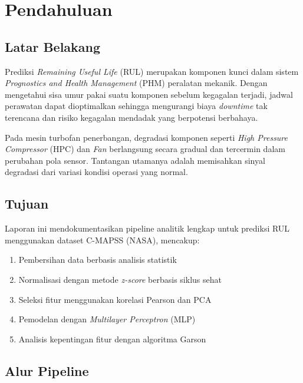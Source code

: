 \documentclass[11pt,a4paper]{article}
\begin{document}
\thispagestyle{empty}
\newpage
\setcounter{page}{1}

\tableofcontents
\newpage

\section{Pendahuluan}

\subsection{Latar Belakang}

Prediksi \textit{Remaining Useful Life} (RUL) merupakan komponen kunci dalam
sistem \textit{Prognostics and Health Management} (PHM) peralatan mekanik.
Dengan mengetahui sisa umur pakai suatu komponen sebelum kegagalan terjadi,
jadwal perawatan dapat dioptimalkan sehingga mengurangi biaya \textit{downtime}
tak terencana dan risiko kegagalan mendadak yang berpotensi berbahaya.

Pada mesin turbofan penerbangan, degradasi komponen seperti
\textit{High Pressure Compressor} (HPC) dan \textit{Fan} berlangsung secara
gradual dan tercermin dalam perubahan pola sensor. Tantangan utamanya adalah
memisahkan sinyal degradasi dari variasi kondisi operasi yang normal.

\subsection{Tujuan}

Laporan ini mendokumentasikan pipeline analitik lengkap untuk prediksi RUL
menggunakan dataset C-MAPSS (NASA), mencakup:
\begin{enumerate}[noitemsep]
  \item Pembersihan data berbasis analisis statistik
  \item Normalisasi dengan metode \textit{z-score} berbasis siklus sehat
  \item Seleksi fitur menggunakan korelasi Pearson dan PCA
  \item Pemodelan dengan \textit{Multilayer Perceptron} (MLP)
  \item Analisis kepentingan fitur dengan algoritma Garson
\end{enumerate}

\subsection{Alur Pipeline}
\end{document}
